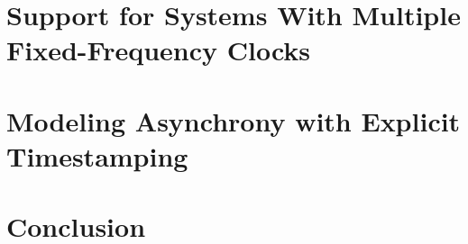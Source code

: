 \documentclass[phd]{ucbthesis}
\begin{document}


%
%

\chapter{Support for Systems With Multiple Fixed-Frequency Clocks}\label{sec:static-multiclock}



\chapter{Modeling Asynchrony with Explicit Timestamping}\label{sec:dynamic-multiclock}



\chapter{Conclusion}



\printbibliography
\end{document}
